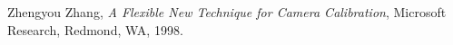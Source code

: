 \documentclass[conference]{IEEEtran}
\begin{document}
%






%
%
%
\begin{thebibliography}{1}

Zhengyou Zhang, \emph{A Flexible New Technique for Camera
Calibration},  Microsoft Research, Redmond, WA, 1998.

\end{thebibliography}




\end{document}
